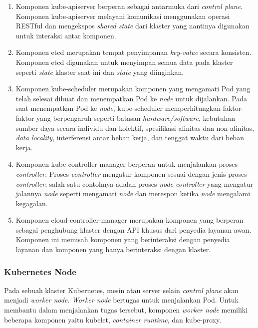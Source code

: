 \begin{enumerate}
  
  \item Komponen kube-apiserver berperan sebagai antarmuka dari \emph{control plane}.
    Komponen kube-apiserver melayani komunikasi menggunakan operasi RESTful dan
    mengekspos \emph{shared state} dari klaster yang nantinya digunakan untuk
    interaksi antar komponen.

  \item Komponen etcd merupakan tempat penyimpanan \emph{key-value} secara konsisten.
    Komponen etcd digunakan untuk menyimpan semua data pada klaster seperti \emph{state}
    klaster saat ini dan \emph{state} yang diinginkan.

  \item Komponen kube-scheduler merupakan komponen yang mengamati Pod yang telah
    selesai dibuat dan menempatkan Pod ke \emph{node} untuk dijalankan. Pada saat
    menempatkan Pod ke \emph{node}, kube-scheduler memperhitungkan faktor-faktor
    yang berpengaruh seperti batasan \emph{hardware/software}, kebutuhan sumber daya secara
    individu dan kolektif, spesifikasi afinitas dan non-afinitas, \emph{data locality}, interferensi
    antar beban kerja, dan tenggat waktu dari beban kerja.

  \item Komponen kube-controller-manager berperan untuk menjalankan proses \emph{controller}.
    Proses \emph{controller} mengatur komponen sesuai dengan jenis proses \emph{controller},
    salah satu contohnya adalah proses \emph{node controller} yang mengatur jalannya \emph{node}
    seperti mengamati \emph{node} dan merespon ketika \emph{node} mengalami kegagalan.

  \item Komponen cloud-controller-manager merupakan komponen yang berperan sebagai penghubung
    klaster dengan API khusus dari penyedia layanan awan. Komponen ini memisah
    komponen yang berinteraksi dengan penyedia layanan dan komponen yang hanya berinteraksi dengan
    klaster.

\end{enumerate}

\subsubsection{Kubernetes Node}

Pada sebuah klaster Kubernetes, mesin atau server selain \emph{control plane} akan menjadi \emph{worker node}.
\emph{Worker node} bertugas untuk menjalankan Pod. Untuk membantu dalam menjalankan tugas tersebut, komponen \emph{worker node}
memiliki beberapa komponen yaitu kubelet, \emph{container runtime}, dan kube-proxy.


